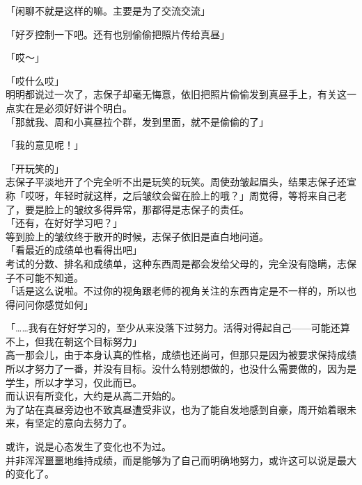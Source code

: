 「闲聊不就是这样的嘛。主要是为了交流交流」

「好歹控制一下吧。还有也别偷偷把照片传给真昼」

「哎～」

「哎什么哎」\\

明明都说过一次了，志保子却毫无悔意，依旧把照片偷偷发到真昼手上，有关这一点实在是必须好好讲个明白。\\

「那就我、周和小真昼拉个群，发到里面，就不是偷偷的了」

「我的意见呢！」

「开玩笑的」\\

志保子平淡地开了个完全听不出是玩笑的玩笑。周使劲皱起眉头，结果志保子还宣称「哎呀，年轻时就这样，之后皱纹会留在脸上的哦？」周觉得，等将来自己老了，要是脸上的皱纹多得异常，那都得是志保子的责任。\\

「还有，在好好学习吧？」\\

等到脸上的皱纹终于散开的时候，志保子依旧是直白地问道。\\

「看最近的成绩单也看得出吧」\\

考试的分数、排名和成绩单，这种东西周是都会发给父母的，完全没有隐瞒，志保子不可能不知道。\\

「话是这么说啦。不过你的视角跟老师的视角关注的东西肯定是不一样的，所以也得问问你感觉如何」

「……我有在好好学习的，至少从来没落下过努力。活得对得起自己——可能还算不上，但我在朝这个目标努力」\\

高一那会儿，由于本身认真的性格，成绩也还尚可，但那只是因为被要求保持成绩所以才努力了一番，并没有目标。没什么特别想做的，也没什么需要做的，因为是学生，所以才学习，仅此而已。\\

而认识有所变化，大约是从高二开始的。\\

为了站在真昼旁边也不致真昼遭受非议，也为了能自发地感到自豪，周开始着眼未来，有坚定的意向去努力了。

或许，说是心态发生了变化也不为过。\\

并非浑浑噩噩地维持成绩，而是能够为了自己而明确地努力，或许这可以说是最大的变化了。\\


